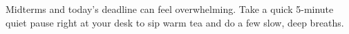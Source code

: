 Midterms and today's deadline can feel overwhelming. Take a quick 5-minute quiet pause right at your desk to sip warm tea and do a few slow, deep breaths.